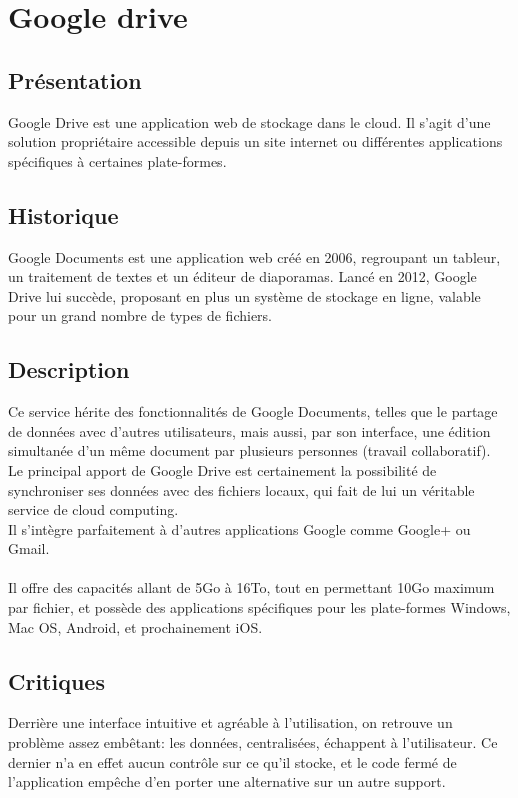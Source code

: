 \section{Google drive}
\thispagestyle{EIP} %

\subsection{Présentation}
Google Drive est une application web de stockage dans le cloud. Il s'agit d'une solution propriétaire accessible depuis un site internet ou différentes applications spécifiques à certaines plate-formes.

\subsection{Historique}
Google Documents est une application web créé en 2006, regroupant un tableur, un traitement de textes et un éditeur de diaporamas.
Lancé en 2012, Google Drive lui succède, proposant en plus un système de stockage en ligne, valable pour un grand nombre de types de fichiers.\\

\subsection{Description}
Ce service hérite des fonctionnalités de Google Documents, telles que le partage de données avec d'autres utilisateurs, mais aussi, par son interface, une édition simultanée d'un même document par plusieurs personnes (travail collaboratif).\\
Le principal apport de Google Drive est certainement la possibilité de synchroniser ses données avec des fichiers locaux, qui fait de lui un véritable service de cloud computing.\\
Il s'intègre parfaitement à d'autres applications Google comme Google+ ou Gmail.\\
\\
Il offre des capacités allant de 5Go à 16To, tout en permettant 10Go maximum par fichier, et possède des applications spécifiques pour les plate-formes Windows, Mac OS, Android, et prochainement iOS.\\

\subsection{Critiques}
Derrière une interface intuitive et agréable à l'utilisation, on retrouve un problème assez embêtant: les données, centralisées, échappent à l'utilisateur. Ce dernier n'a en effet aucun contrôle sur ce qu'il stocke, et le code fermé de l'application empêche d'en porter une alternative sur un autre support.